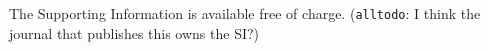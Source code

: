 \documentclass[journal=jacsat,manuscript=article]{achemso}
\newcommand{\alltodo}[1]{{\color{Cyan} (\texttt{alltodo}: #1)}}
\begin{document}
\begin{suppinfo}
The Supporting Information is available free of charge. \alltodo{I think the journal that publishes this owns the SI?}

\end{suppinfo}



\end{document}
